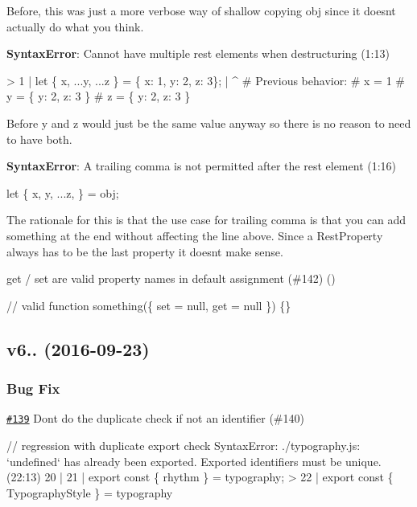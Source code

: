 Before, this was just a more verbose way of shallow copying {\ttfamily obj} since it doesn\textquotesingle{}t actually do what you think.

{\bfseries Syntax\+Error}\+: Cannot have multiple rest elements when destructuring (1\+:13)


\begin{DoxyCode}
> 1 | let \{ x, ...y, ...z \} = \{ x: 1, y: 2, z: 3\};
    |              ^
# Previous behavior:
# x = 1
# y = \{ y: 2, z: 3 \}
# z = \{ y: 2, z: 3 \}
\end{DoxyCode}


Before y and z would just be the same value anyway so there is no reason to need to have both.

{\bfseries Syntax\+Error}\+: A trailing comma is not permitted after the rest element (1\+:16)


\begin{DoxyCode}
let \{ x, y, ...z, \} = obj;
\end{DoxyCode}


The rationale for this is that the use case for trailing comma is that you can add something at the end without affecting the line above. Since a Rest\+Property always has to be the last property it doesn\textquotesingle{}t make sense. 



get / set are valid property names in default assignment (\#142) (\href{https://github.com/jezell}{\tt })


\begin{DoxyCode}
// valid
function something(\{ set = null, get = null \}) \{\}
\end{DoxyCode}


\subsection*{v6.. (2016-\/09-\/23)}

\subsubsection*{Bug Fix}


\begin{DoxyItemize}
\item \href{https://github.com/babel/babylon/issues/139}{\tt \#139} Don\textquotesingle{}t do the duplicate check if not an identifier (\#140) 
\end{DoxyItemize}


\begin{DoxyCode}
// regression with duplicate export check
SyntaxError: ./typography.js: `undefined` has already been exported. Exported identifiers must be unique.
       (22:13)
  20 |
  21 | export const \{ rhythm \} = typography;
> 22 | export const \{ TypographyStyle \} = typography
\end{DoxyCode}


